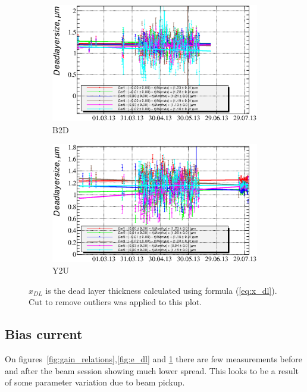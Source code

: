 \documentclass[a4paper,12pt]{article}
\begin{document}
\begin{figure}[p]
\begin{subfigure}[b]{0.5\textwidth}
\includegraphics[width=\textwidth]{gfx/run13_alpha_study/B2D/c_chDeadLayerSize_by_day_B2D.eps}
\caption{B2D}
\end{subfigure}
\begin{subfigure}[b]{0.5\textwidth}
\includegraphics[width=\textwidth]{gfx/run13_alpha_study/Y2U/c_chDeadLayerSize_by_day_Y2U.eps}
\caption{Y2U}
\end{subfigure}
\caption{$x_{DL}$ is the dead layer thickness calculated using formula (\ref{eq:x_dl}). Cut to remove
outliers was applied to this plot.}
\label{fig:x_dl}
\end{figure}

\subsection{Bias current}


On figures~\ref{fig:gain_relations},\ref{fig:e_dl} and \ref{fig:x_dl} there are few measurements
before and after the beam session showing much lower spread. This looks to be a result of some
parameter variation due to beam pickup.
\end{document}
